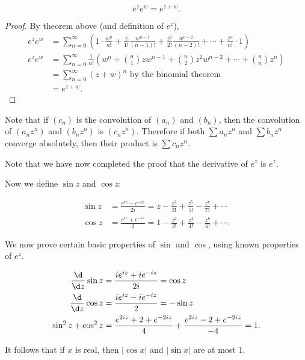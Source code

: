 \documentclass[a4paper]{article}
\begin{document}
\begin{cor}
  \[
    e^z e^w = e^{z + w}.
  \]
\end{cor}

\begin{proof}
  By theorem above (and definition of $e^z$),
  \begin{align*}
    e^z e^w &= \sum_{n = 0}^\infty \left(1\cdot \frac{w^n}{n!} + \frac{z}{1!}\frac{w^{n - 1}}{(n- 1)!} + \frac{z^2}{2!}\frac{w^{n - 2}}{(n- 2)!} + \cdots + \frac{z^{n}}{n!}\cdot 1\right)\\
    e^z e^w &= \sum_{n = 0}^\infty \frac{1}{n!}\left(w^n + \binom{n}{1} zw^{n - 1} + \binom{n}{2}z^2 w^{n - 2} + \cdots + \binom{n}{n}z^n\right)\\
    &= \sum_{n = 0}^\infty (z + w)^n \text{ by the binomial theorem}\\
    &= e^{z + w}.
  \end{align*}
\end{proof}
Note that if $(c_n)$ is the convolution of $(a_n)$ and $(b_n)$, then the convolution of $(a_nz^n)$ and $(b_nz^n)$ is $(c_nz^n)$. Therefore if both $\sum a_n z^n$ and $\sum b_nz^n$ converge absolutely, then their product is $\sum c_n z^n$.

Note that we have now completed the proof that the derivative of $e^z$ is $e^z$.

Now we define $\sin z$ and $\cos z$:
\begin{defi}
  \begin{align*}
    \sin z &= \frac{e^{iz} - e^{-iz}}{2i} = z - \frac{z^3}{3!} + \frac{z^5}{5!} - \frac{z^7}{7!} + \cdots\\
    \cos z &= \frac{e^{iz} + e^{-iz}}{2} = 1 - \frac{z^2}{2!} + \frac{z^4}{4!} - \frac{z^6}{6!} + \cdots.
  \end{align*}
\end{defi}

We now prove certain basic properties of $\sin$ and $\cos$, using known properties of $e^z$.
\begin{prop}
  \begin{align*}
    \frac{\d}{\d z}\sin z &= \frac{ie^{iz} + ie^{-iz}}{2i} = \cos z\\
    \frac{\d}{\d z}\cos z &= \frac{ie^{iz} - ie^{-iz}}{2} = -\sin z\\
    \sin^2 z + \cos ^2 z &= \frac{e^{2iz} + 2 + e^{-2iz}}{4} + \frac{e^{2iz} - 2 + e^{-2iz}}{-4} = 1.
  \end{align*}
\end{prop}
It follows that if $x$ is real, then $|\cos x|$ and $|\sin x|$ are at most $1$.
\end{document}
